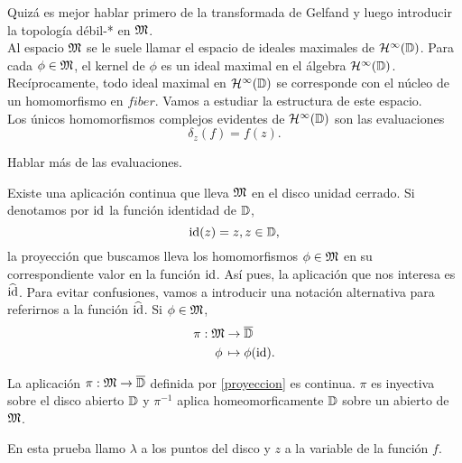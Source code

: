 Quizá es mejor hablar primero de la transformada de Gelfand y luego introducir la topología débil-* en $\mathfrak{M}$. \\

Al espacio $\mathfrak{M}$ se le suele llamar el espacio de ideales maximales de $\mathcal{H}^{\infty}(\mathbb{D})$. Para cada $\phi \in \mathfrak{M}$, el kernel de $\phi$ es un ideal maximal en el álgebra $\mathcal{H}^{\infty}(\mathbb{D})$. Recíprocamente, todo ideal maximal en $\mathcal{H}^{\infty}(\mathbb{D})$ se corresponde con el núcleo de un homomorfismo en $fiber$. Vamos a estudiar la estructura de este espacio. \\

Los únicos homomorfismos complejos evidentes de $\mathcal{H}^{\infty}(\mathbb{D})$ son las evaluaciones
\begin{equation*}
    \delta_z (f) = f(z).
\end{equation*}

Hablar más de las evaluaciones.

Existe una aplicación continua que lleva $\mathfrak{M}$ en el disco unidad cerrado. Si denotamos por $\operatorname{id}$ la función identidad de $\mathbb{D}$,
\begin{equation*}
    \operatorname{id}(z) = z, z \in \mathbb{D},
\end{equation*}
la proyección que buscamos lleva los homomorfismos $\phi \in \mathfrak{M}$ en su correspondiente valor en la función $\operatorname{id}$. Así pues, la aplicación que nos interesa es $\widehat {\operatorname{id}}$. Para evitar confusiones, vamos a introducir una notación alternativa para referirnos a la función $\widehat {\operatorname{id}}$. Si $\phi \in \mathfrak{M}$,
\begin{equation}
    \label{proyeccion}
    \begin{split}
        \pi: \mathfrak{M} & \rightarrow \overline{\mathbb{D}} \\
            \phi \, & \mapsto  \phi (\operatorname{id}).
    \end{split}
\end{equation}

\begin{theorem}
    La aplicación $\pi: \mathfrak{M} \rightarrow \overline{\mathbb{D}}$ definida por \ref{proyeccion} es continua. $\pi$ es inyectiva sobre el disco abierto $\mathbb{D}$ y $\pi^{-1}$ aplica homeomorficamente $\mathbb{D}$ sobre un abierto de $\mathfrak{M}$.
\end{theorem}

En esta prueba llamo $\lambda$ a los puntos del disco y $z$ a la variable de la función $f$.

